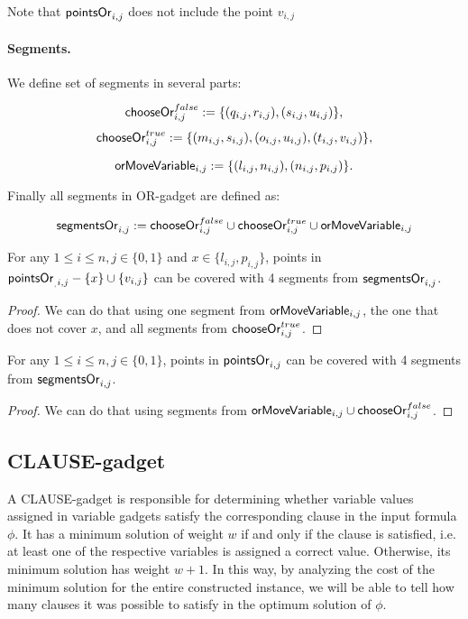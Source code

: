 Note that $\mathsf{pointsOr}_{i,j}$ does not include the point $v_{i,j}$
 
\paragraph{Segments.}

We define set of segments in several parts:
 
$$\mathsf{chooseOr}^{false}_{i,j} :=
\{ (q_{i, j}, r_{i, j}), (s_{i, j}, u_{i, j})\},$$
$$\mathsf{chooseOr}^{true}_{i,j} :=
\{ (m_{i, j}, s_{i, j}), (o_{i, j}, u_{i, j}),
(t_{i, j}, v_{i, j}) \},$$

$$\mathsf{orMoveVariable}_{i,j} :=
\{ (l_{i, j}, n_{i, j}), (n_{i, j}, p_{i, j})\}.$$

Finally all segments in OR-gadget are defined as:

$$\mathsf{segmentsOr}_{i,j} := 
  \mathsf{chooseOr}^{false}_{i,j} \cup \mathsf{chooseOr}^{true}_{i,j} \cup \mathsf{orMoveVariable}_{i,j}
$$


\begin{lemma}
\label{cover_or_true}
For any $1 \le i \le n, j \in \{0, 1\}$ and 
 $x \in \{l_{i, j}, p_{i, j}\}$, points in
$\mathsf{pointsOr}_{_,i, j} - \{ x\} \cup \{v_{i, j}\}$
can be covered
with 4 segments from $\mathsf{segmentsOr}_{i,j}$.
\end{lemma}

\begin{proof}
We can do that using one segment from
$\mathsf{orMoveVariable}_{i,j}$, the one that does not cover $x$,
and all segments from $\mathsf{chooseOr}^{true}_{i,j}$.
\end{proof}

\begin{lemma}
\label{cover_or_false}
For any $1 \le i \le n, j \in \{0, 1\}$, points in
$\mathsf{pointsOr}_{i,j}$ can be covered
with 4 segments from $\mathsf{segmentsOr}_{i,j}$.
\end{lemma}

\begin{proof}
We can do that using segments from $\mathsf{orMoveVariable}_{i,j} \cup \mathsf{chooseOr}^{false}_{i,j}$.
\end{proof}


\subsection{CLAUSE-gadget}
A CLAUSE-gadget is responsible for determining whether
variable values assigned in variable gadgets
satisfy the corresponding clause in the input formula $\phi$.
It has a minimum solution of weight $w$
if and only if the clause is satisfied, i.e. at least one
of the respective variables is assigned a correct value.
Otherwise, its minimum solution has weight $w+1$.
In this way, by analyzing the cost of the minimum solution
for the entire constructed instance, we will be able to tell
how many clauses it was possible to satisfy
in the optimum solution of $\phi$.

